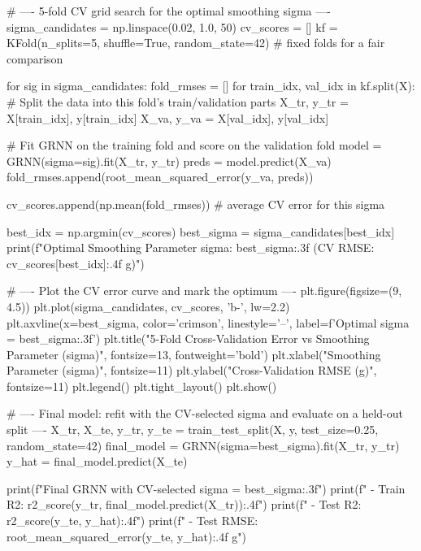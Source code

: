 \begin{codebox}[title={5-fold CV grid search for the optimal smoothing sigma}]
# ---- 5-fold CV grid search for the optimal smoothing sigma ----
sigma_candidates = np.linspace(0.02, 1.0, 50)
cv_scores = []
kf = KFold(n_splits=5, shuffle=True, random_state=42)   # fixed folds for a fair comparison

for sig in sigma_candidates:
    fold_rmses = []
    for train_idx, val_idx in kf.split(X):
        # Split the data into this fold's train/validation parts
        X_tr, y_tr = X[train_idx], y[train_idx]
        X_va, y_va = X[val_idx], y[val_idx]

        # Fit GRNN on the training fold and score on the validation fold
        model = GRNN(sigma=sig).fit(X_tr, y_tr)
        preds = model.predict(X_va)
        fold_rmses.append(root_mean_squared_error(y_va, preds))

    cv_scores.append(np.mean(fold_rmses))   # average CV error for this sigma

best_idx = np.argmin(cv_scores)
best_sigma = sigma_candidates[best_idx]
print(f"Optimal Smoothing Parameter sigma: {best_sigma:.3f} (CV RMSE: {cv_scores[best_idx]:.4f} g)")

# ---- Plot the CV error curve and mark the optimum ----
plt.figure(figsize=(9, 4.5))
plt.plot(sigma_candidates, cv_scores, 'b-', lw=2.2)
plt.axvline(x=best_sigma, color='crimson', linestyle='--', label=f'Optimal sigma = {best_sigma:.3f}')
plt.title("5-Fold Cross-Validation Error vs Smoothing Parameter (sigma)", fontsize=13, fontweight='bold')
plt.xlabel("Smoothing Parameter (sigma)", fontsize=11)
plt.ylabel("Cross-Validation RMSE (g)", fontsize=11)
plt.legend()
plt.tight_layout()
plt.show()
\end{codebox}

\begin{codebox}[title={Final model: refit with the CV-selected sigma and evaluate on a held-out split}]
# ---- Final model: refit with the CV-selected sigma and evaluate on a held-out split ----
X_tr, X_te, y_tr, y_te = train_test_split(X, y, test_size=0.25, random_state=42)
final_model = GRNN(sigma=best_sigma).fit(X_tr, y_tr)
y_hat = final_model.predict(X_te)

print(f"Final GRNN with CV-selected sigma = {best_sigma:.3f}")
print(f" - Train R2:  {r2_score(y_tr, final_model.predict(X_tr)):.4f}")
print(f" - Test R2:   {r2_score(y_te, y_hat):.4f}")
print(f" - Test RMSE: {root_mean_squared_error(y_te, y_hat):.4f} g")
\end{codebox}
